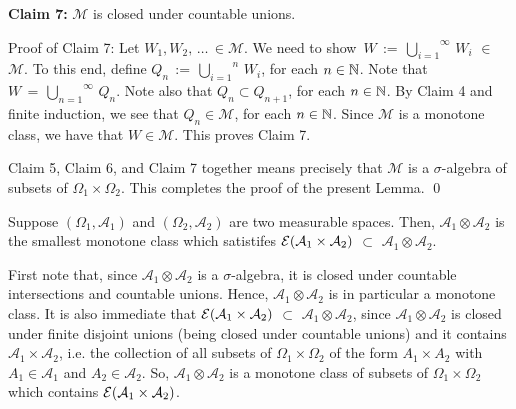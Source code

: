\vskip 0.5cm
\begin{center}
\begin{minipage}{6.5in}
\textbf{Claim 7:}\quad
$\mathcal{M}$ is closed under countable unions.
\end{minipage}
\end{center}
Proof of Claim 7:\quad
Let $W_{1}, W_{2}, \,\ldots\,\in\mathcal{M}$.
We need to show
\,$W \,:=\, \overset{\infty}{\underset{i=1}{\bigcup}}\,W_{i}$ $\in$ $\mathcal{M}$.
To this end, define
$Q_{n} \,:=\, \overset{n}{\underset{i=1}{\bigcup}}\,W_{i}$, for each $n\in\mathbb{N}$.
Note that $W \,=\, \overset{\infty}{\underset{n=1}{\bigcup}}\,Q_{n}$.
Note also that $Q_{n} \subset Q_{n+1}$, for each $n\in\mathbb{N}$.
By Claim 4 and finite induction, we see that $Q_{n} \in \mathcal{M}$, for each $n\in\mathbb{N}$.
Since $\mathcal{M}$ is a monotone class, we have that $W \in \mathcal{M}$.
This proves Claim 7.

\vskip 0.5cm
\noindent
Claim 5, Claim 6, and Claim 7 together means precisely that $\mathcal{M}$ is a $\sigma$-algebra
of subsets of $\Omega_{1}\times\Omega_{2}$.
This completes the proof of the present Lemma.
\qed

\begin{theorem}
\mbox{}\vskip0.1cm\noindent
Suppose
$\left(\Omega_{1},\mathcal{A}_{1}\right)$ and $\left(\Omega_{2},\mathcal{A}_{2}\right)$
are two measurable spaces.\;
Then, $\mathcal{A}_{1}\otimes\mathcal{A}_{2}$ is the smallest monotone class which satistifes
$\mathcal{E}\!\left(\mathcal{A}_{1}\times\mathcal{A}_{2}\right)$
$\subset$
$\mathcal{A}_{1}\otimes\mathcal{A}_{2}$.
\end{theorem}
\proof
First note that, since $\mathcal{A}_{1}\otimes\mathcal{A}_{2}$ is a $\sigma$-algebra,
it is closed under countable intersections and countable unions.
Hence, $\mathcal{A}_{1}\otimes\mathcal{A}_{2}$ is in particular a monotone class.
It is also immediate that
$\mathcal{E}\!\left(\mathcal{A}_{1}\times\mathcal{A}_{2}\right)$
$\subset$
$\mathcal{A}_{1}\otimes\mathcal{A}_{2}$,
since 
$\mathcal{A}_{1}\otimes\mathcal{A}_{2}$ is closed under finite disjoint unions
(being closed under countable unions) and
it contains $\mathcal{A}_{1}\times\mathcal{A}_{2}$,
i.e. the collection of all subsets of $\Omega_{1}\times\Omega_{2}$ of the form
$A_{1}\times A_{2}$ with $A_{1} \in \mathcal{A}_{1}$ and $A_{2}\in\mathcal{A}_{2}$.
So, $\mathcal{A}_{1}\otimes\mathcal{A}_{2}$ is a monotone class of subsets
of $\Omega_{1}\times\Omega_{2}$ which contains
$\mathcal{E}\!\left(\mathcal{A}_{1}\times\mathcal{A}_{2}\right)$.

